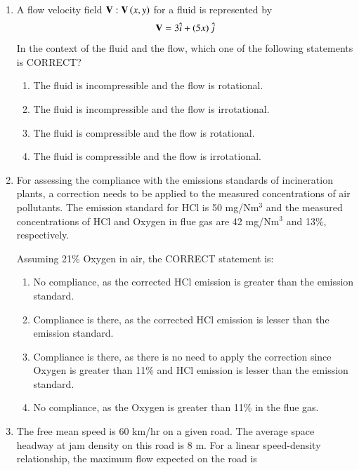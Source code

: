 \documentclass[journal,12pt,onecolumn]{article}
\theoremstyle{remark}
\begin{document}
\begin{enumerate}
    \item A flow velocity field $\mathbf{V}: \mathbf{V}\left(x, y\right)$ for a fluid is represented by
    \begin{align}
    \mathbf{V} = 3\hat{i} + \left(5x\right)\hat{j}
    \end{align}
    In the context of the fluid and the flow, which one of the following statements is CORRECT?
    
    \hfill{}
    \begin{enumerate}
        \item The fluid is incompressible and the flow is rotational.
        \item The fluid is incompressible and the flow is irrotational.
        \item The fluid is compressible and the flow is rotational.
        \item The fluid is compressible and the flow is irrotational.
    \end{enumerate}
    
    \item For assessing the compliance with the emissions standards of incineration plants, a correction needs to be applied to the measured concentrations of air pollutants. The emission standard  for HCl is 50 mg/Nm$^3$ and the measured concentrations of HCl and Oxygen in flue gas are 42 mg/Nm$^3$ and 13\%, respectively.
    
    Assuming 21\% Oxygen in air, the CORRECT statement is:
    
    \hfill{}
    \begin{enumerate}
        \item No compliance, as the corrected HCl emission is greater than the emission standard.
        \item Compliance is there, as the corrected HCl emission is lesser than the emission standard.
        \item Compliance is there, as there is no need to apply the correction since Oxygen is greater than 11\% and HCl emission is lesser than the emission standard.
        \item No compliance, as the Oxygen is greater than 11\% in the flue gas.
    \end{enumerate}
    
    \item The free mean speed is 60 km/hr on a given road. The average space headway at jam density on this road is 8 m. For a linear speed-density relationship, the maximum flow  expected on the road is
    

\end{enumerate}
\end{document}
